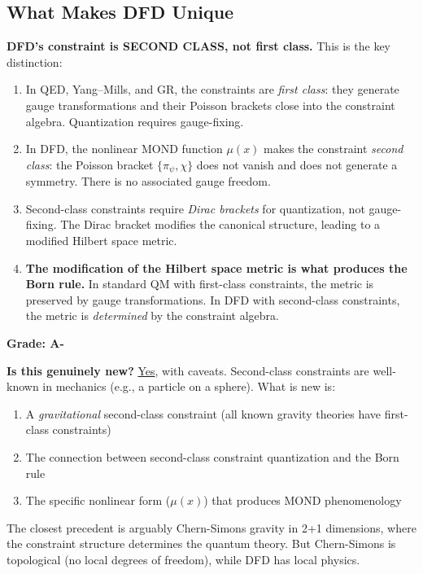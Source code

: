 \documentclass[11pt,a4paper]{article}
\begin{document}
\subsection{What Makes DFD Unique}

\textbf{DFD's constraint is SECOND CLASS, not first class.} This is the key distinction:

\begin{enumerate}
\item In QED, Yang--Mills, and GR, the constraints are \emph{first class}: they generate gauge transformations and their Poisson brackets close into the constraint algebra. Quantization requires gauge-fixing.

\item In DFD, the nonlinear MOND function $\mu(x)$ makes the constraint \emph{second class}: the Poisson bracket $\{\pi_\psi, \chi\}$ does not vanish and does not generate a symmetry. There is no associated gauge freedom.

\item Second-class constraints require \emph{Dirac brackets} for quantization, not gauge-fixing. The Dirac bracket modifies the canonical structure, leading to a modified Hilbert space metric.

\item \textbf{The modification of the Hilbert space metric is what produces the Born rule.} In standard QM with first-class constraints, the metric is preserved by gauge transformations. In DFD with second-class constraints, the metric is \emph{determined} by the constraint algebra.
\end{enumerate}

\textbf{Grade: A-}

\textbf{Is this genuinely new?} \underline{Yes}, with caveats. Second-class constraints are well-known in mechanics (e.g., a particle on a sphere). What is new is:
\begin{enumerate}
\item A \emph{gravitational} second-class constraint (all known gravity theories have first-class constraints)
\item The connection between second-class constraint quantization and the Born rule
\item The specific nonlinear form ($\mu(x)$) that produces MOND phenomenology
\end{enumerate}

The closest precedent is arguably Chern-Simons gravity in 2+1 dimensions, where the constraint structure determines the quantum theory. But Chern-Simons is topological (no local degrees of freedom), while DFD has local physics.
\end{document}
